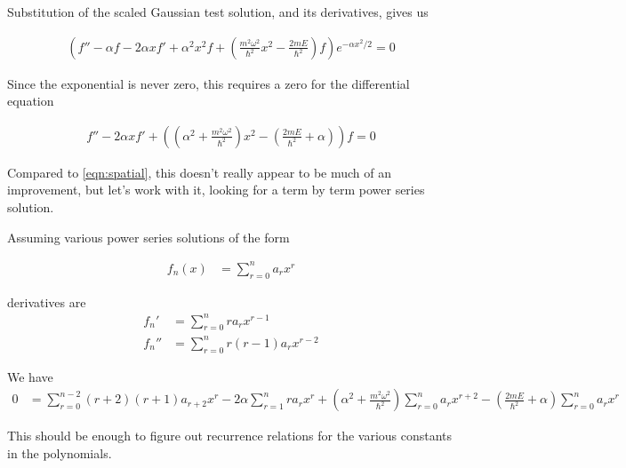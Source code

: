 \documentclass{article}
\begin{document}
Substitution of the scaled Gaussian test solution, and its derivatives, gives us

\begin{align*}
\left( f'' - \alpha f - 2 \alpha x f' + \alpha^2 x^2 f + \left( \frac{m^2 \omega^2}{\hbar^2} x^2 - \frac{2 m E}{\hbar^2} \right) f \right) e^{ -\alpha x^2 /2} = 0
\end{align*}

Since the exponential is never zero, this requires a zero for the differential equation

\begin{align}
f'' - 2 \alpha x f' + \left( \left(\alpha^2 + \frac{m^2 \omega^2}{\hbar^2} \right) x^2 - \left(\frac{2 m E}{\hbar^2} + \alpha \right) \right) f = 0
\end{align}

Compared to \ref{eqn:spatial}, this doesn't really appear to be much of an improvement, but let's work with it, looking for a term by term power series solution.

Assuming various power series solutions of the form

\begin{align*}
f_n(x) &= \sum_{r=0}^n a_r x^r
\end{align*}

derivatives are
\begin{align*}
f_n' &= \sum_{r=0}^n r a_r x^{r-1} \\
f_n'' &= \sum_{r=0}^n r(r-1) a_r x^{r-2}
\end{align*}

We have 
\begin{align*}
0 &= \sum_{r=0}^{n-2} (r+2)(r+1) a_{r+2} x^{r}
 - 2 \alpha \sum_{r=1}^n r a_r x^{r}
+ \left(\alpha^2 + \frac{m^2 \omega^2}{\hbar^2} \right) \sum_{r=0}^n a_r x^{r+2}
- \left(\frac{2 m E}{\hbar^2} + \alpha \right) \sum_{r=0}^n a_r x^r
\end{align*}

This should be enough to figure out recurrence relations for the various constants in the polynomials.



\end{document}
